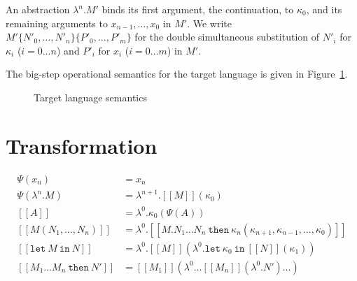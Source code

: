 \documentclass[a4paper,11pt]{article}
\begin{document}
An abstraction $\lambda^{n}.M'$ binds its first argument, the continuation,
to $\kappa_{0}$, and its remaining arguments to $x_{n-1}, \ldots, x_{0}$ in
$M'$.
We write $M'\{N'_{0}, \ldots, N'_{n}\}\{P'_{0}, \ldots, P'_{m}\}$ for the
double simultaneous substitution of $N'_{i}$ for $\kappa_{i}$
($i = 0 \ldots n$) and $P'_{i}$ for $x_{i}$ ($i = 0 \ldots m$) in $M'$.

The big-step operational semantics for the target language is given in
Figure~\ref{fig:targetsemantics}.

\begin{figure}
\caption{Target language semantics}
\label{fig:targetsemantics}
\end{figure}


\section{Transformation}\label{sec:transformation}

\begin{align*}
\Psi(x_{n}) &=
  x_{n} \\
\Psi(\lambda^{n}.M) &=
  \lambda^{n+1}.[\![M]\!](\kappa_{0}) \\[1em]
[\![A]\!] &=
  \lambda^{0}.\kappa_{0} (\Psi(A)) \\
[\![M(N_{1}, \ldots, N_{n})]\!] &=
  \lambda^{0}.[\![M . N_{1} \ldots N_{n} \: \texttt{then} \:
  \kappa_{n}(\kappa_{n+1}, \kappa_{n-1}, \ldots, \kappa_{0})]\!] \\
[\![\texttt{let} \: M \: \texttt{in} \: N]\!] &=
  \lambda^{0}.[\![M]\!] (\lambda^{0}.\texttt{let} \:
  \kappa_{0} \: \texttt{in} \: [\![N]\!] (\kappa_{1})) \\
[\![M_{1} \ldots M_{n} \: \texttt{then} \: N']\!] &=
  [\![M_{1}]\!] (\lambda^{0} \ldots [\![M_{n}]\!] (\lambda^{0}.N') \ldots )
\end{align*}
\end{document}
